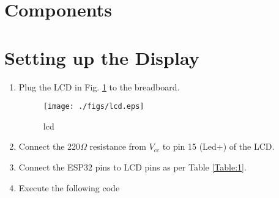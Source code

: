 \documentclass[journal,12pt,twocolumn]{IEEEtran}
\renewcommand\thesection{\arabic{section}}
\begin{document}




\begin{abstract}
Through this manual, we will learn how to setting up the display and how to measure an unknown resistance through ESP32 and display it on an LCD.
\end{abstract}
\section{Components}


\begin{table}[!h]
\centering

\caption{}
\label{table:components}
\end{table}
\section{Setting up the Display}
\begin{enumerate}[label=\thesection.\arabic*.,ref=\thesection.\theenumi]
\item
Plug the LCD in Fig. \ref{fig:lcd} to the breadboard.

%
\begin{figure}
\centering
\texttt{[image: ./figs/lcd.eps]}
\caption{lcd}
\label{fig:lcd}
\end{figure}

%
\item
Connect the 220$\Omega$ resistance from $V_{cc}$ to pin 15 (Led+) of the LCD.

%
%
%
\item
Connect the ESP32 pins to LCD pins as per Table \ref{Table:1}.
\begin{table}[h]
\centering

\caption{}
\label{Table:1}
\end{table}

\item Execute the following code
\end{enumerate}
\end{document}
